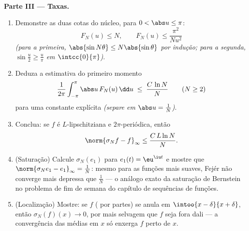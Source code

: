 \begin{problem}
\medskip
\noindent\textbf{Parte III --- Taxas.}
\begin{enumerate}[resume]
  \item Demonstre as duas cotas do núcleo, para $0 < \abs u \leq
        \pi$:
        \[
        F_N(u) \leq N,
        \qquad
        F_N(u) \leq \frac{\pi^2}{N u^2}
        \]
        \emph{(para a primeira, $\abs{\sin N\theta} \leq
        N\abs{\sin\theta}$ por indução; para a segunda,
        $\sin\frac u2 \geq \frac{u}{\pi}$ em
        $\intcc{0}{\pi}$)}.
  \item Deduza a estimativa do primeiro momento
        \[
        \frac{1}{2\pi}\int_{-\pi}^{\pi}\abs u\,F_N(u)\,\dd u
        \;\leq\; \frac{C\,\ln N}{N}
        \qquad (N \geq 2)
        \]
        para uma constante explícita \emph{(separe em $\abs u =
        \frac1N$)}.
  \item Conclua: se $f$ é $L$-lipschitziana e $2\pi$-periódica,
        então
        \[
        \norm{\sigma_N f - f}_\infty \leq \frac{C\,L\ln N}{N} .
        \]
  \item (Saturação) Calcule $\sigma_N(e_1)$ para $e_1(t) =
        \eu^{\iu t}$ e mostre que $\norm{\sigma_Ne_1 - e_1}_\infty
        = \frac1N$: mesmo para as funções mais suaves, Fejér
        não converge mais depressa que $\frac1N$ --- o análogo exato
        da saturação de Bernstein no problema de fim de semana do
        capítulo de sequências de funções.
  \item (Localização) Mostre: se $f$ ( por partes)
        se anula em $\intoo{x - \delta}{x + \delta}$, então
        $\sigma_N(f)(x) \to 0$, por mais selvagem que $f$ seja fora dali
        --- a convergência das médias em $x$ só enxerga $f$ perto de
        $x$.
\end{enumerate}


\end{problem}
